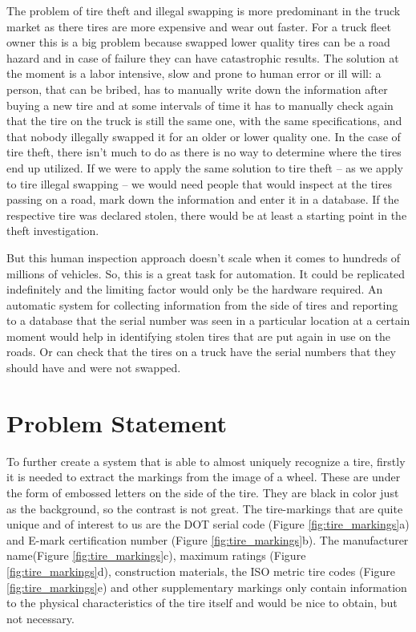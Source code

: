 The problem of tire theft and illegal swapping is more predominant in the truck market as there tires are more expensive and wear out faster. For a truck fleet owner this is a big problem because swapped lower quality tires can be a road hazard and in case of failure they can have catastrophic results. The solution at the moment is a labor intensive, slow and prone to human error or ill will: a person, that can be bribed, has to manually write down the information after buying a new tire and at some intervals of time it has to manually check again that the tire on the truck is still the same one, with the same specifications, and that nobody illegally swapped it for an older or lower quality one. In the case of tire theft, there isn't much to do as there is no way to determine where the tires end up utilized. If we were to apply the same solution to tire theft -- as we apply to tire illegal swapping -- we would need people that would inspect at the tires passing on a road, mark down the information and enter it in a database. If the respective tire was declared stolen, there would be at least a starting point in the theft investigation.

But this human inspection approach doesn't scale when it comes to hundreds of millions of vehicles. So, this is a great task for automation. It could be replicated indefinitely and the limiting factor would only be the hardware required. An automatic system for collecting information from the side of tires and reporting to a database that the serial number was seen in a particular location at a certain moment would help in identifying stolen tires that are put again in use on the roads. Or can check that the tires on a truck have the serial numbers that they should have and were not swapped.

\section{Problem Statement}
\label{sec:problem-statement}

To further create a system that is able to almost uniquely recognize a tire, firstly it is needed to extract the markings from the image of a wheel. These are under the form of embossed letters on the side of the tire. They are black in color just as the background, so the contrast is not great. The tire-markings that are quite unique and of interest to us are the DOT serial code (Figure \ref{fig:tire_markings}a) and E-mark certification number (Figure \ref{fig:tire_markings}b). The manufacturer name(Figure \ref{fig:tire_markings}c), maximum ratings (Figure \ref{fig:tire_markings}d), construction materials, the ISO metric tire codes (Figure \ref{fig:tire_markings}e) and other supplementary markings only contain information to the physical characteristics of the tire itself and would be nice to obtain, but not necessary.

